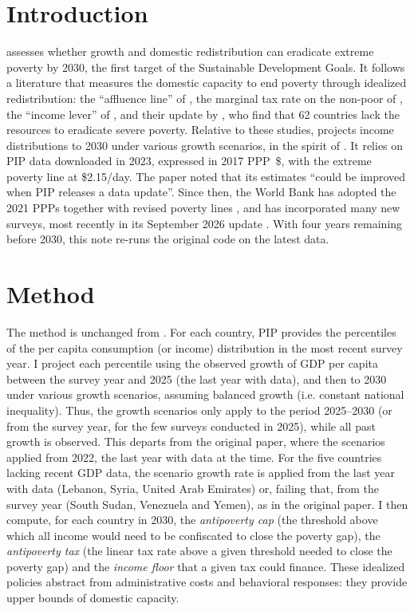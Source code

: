 \section{Introduction}

\cite{fabre_shortfall_2025} assesses whether growth and domestic redistribution can eradicate extreme poverty by 2030, the first target of the Sustainable Development Goals. It follows a literature that measures the domestic capacity to end poverty through idealized redistribution: the ``affluence line'' of \cite{medeiros_rich_2006}, the marginal tax rate on the non-poor of \cite{ravallion_poorer_2010}, the ``income lever'' of \cite{ceriani_income_2014}, and their update by \cite{bolch_arithmetics_2022}, who find that 62 countries lack the resources to eradicate severe poverty. Relative to these studies, \cite{fabre_shortfall_2025} projects income distributions to 2030 under various growth scenarios, in the spirit of \cite{lakner_how_2022}. It relies on PIP data downloaded in 2023, expressed in 2017 PPP~\$, with the extreme poverty line at \$2.15/day. The paper noted that its estimates ``could be improved when PIP releases a data update''. Since then, the World Bank has adopted the 2021 PPPs together with revised poverty lines \citep{foster_global_2025}, and has incorporated many new surveys, most recently in its September 2026 update \citep{castaneda_aguilar_september_2026}. With four years remaining before 2030, this note re-runs the original code on the latest data.

\section{Method}

The method is unchanged from \cite{fabre_shortfall_2025}. For each country, PIP provides the percentiles of the per capita consumption (or income) distribution in the most recent survey year. I project each percentile using the observed growth of GDP per capita between the survey year and 2025 (the last year with data), and then to 2030 under various growth scenarios, assuming balanced growth (i.e. constant national inequality). Thus, the growth scenarios only apply to the period 2025--2030 (or from the survey year, for the few surveys conducted in 2025), while all past growth is observed. This departs from the original paper, where the scenarios applied from 2022, the last year with data at the time. For the five countries lacking recent GDP data, the scenario growth rate is applied from the last year with data (Lebanon, Syria, United Arab Emirates) or, failing that, from the survey year (South Sudan, Venezuela and Yemen), as in the original paper. I then compute, for each country in 2030, the \textit{antipoverty cap} (the threshold above which all income would need to be confiscated to close the poverty gap), the \textit{antipoverty tax} (the linear tax rate above a given threshold needed to close the poverty gap) and the \textit{income floor} that a given tax could finance. These idealized policies abstract from administrative costs and behavioral responses: they provide upper bounds of domestic capacity.

